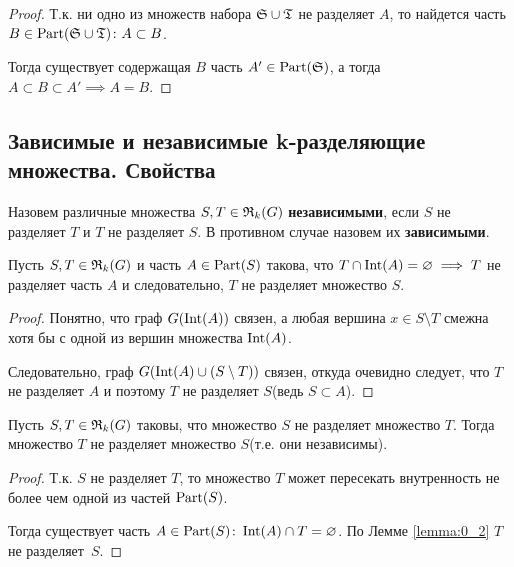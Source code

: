\begin{proof}
	Т.к. ни одно из множеств набора $\mathfrak{S} \cup \mathfrak{T}$ не разделяет  $A$, то найдется часть  $B \in \operatorname{Part}(\mathfrak{S} \cup \mathfrak{T}) \colon A \subset B$.

	Тогда существует содержащая  $B$ часть  $A' \in \operatorname{Part}(\mathfrak{S})$, а тогда  $A \subset B \subset A' \implies A = B$.
\end{proof}

\subsection{Зависимые и независимые k-разделяющие множества. Свойства}

\begin{df*}
	Назовем различные множества $S, T \in \mathfrak{R}_k(G)$ \textbf{независимыми}, если $S$ не разделяет $T$ и $T$ не разделяет $S$.
	В противном случае назовем их \textbf{зависимыми}.
\end{df*}

\begin{customlm}{2} \label{lemma:0_2}
	Пусть $S, T \in \mathfrak{R}_k(G)$ и часть  $A \in \operatorname{Part}(S)$ такова, что  $T \cap \operatorname{Int}(A) = \varnothing \implies T$ не разделяет часть  $A$ и следовательно,  $T$ не разделяет множество  $S$.
\end{customlm}

\begin{proof}
	Понятно, что граф $G(\operatorname{Int}(A))$ связен, а любая вершина  $x \in S \setminus T$ смежна хотя бы с одной из вершин множества  $\operatorname{Int}(A)$.

	Следовательно, граф  $G(\operatorname{Int}(A) \cup (S \setminus T))$ связен, откуда очевидно следует, что  $T$ не разделяет  $A$ и  поэтому $T$ не разделяет  $S$(ведь $S \subset A$).
\end{proof}

\begin{customlm}{3} \label{lemma:0_3}
	Пусть $S, T \in \mathfrak{R}_k(G)$ таковы, что множество  $S$ не разделяет множество $T$. Тогда множество $T$ не разделяет множество $S$(т.е. они независимы).
\end{customlm}

\begin{proof}
	Т.к. $S$ не разделяет $T$, то множество $T$ может пересекать внутренность не более чем одной из частей $\operatorname{Part}(S)$.

	Тогда существует часть  $A \in \operatorname{Part}(S) \colon \operatorname{Int}(A) \cap T = \varnothing$.
	По Лемме \ref{lemma:0_2} $T$ не разделяет~$S$.
\end{proof}

